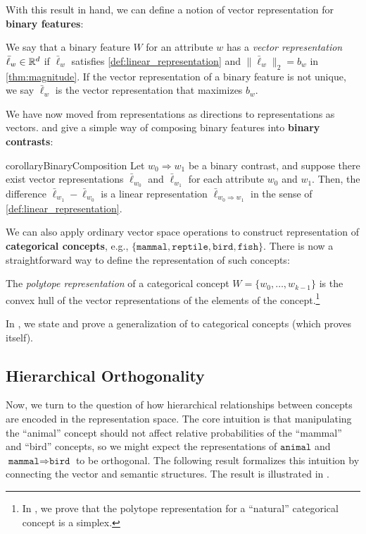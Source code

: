 \documentclass{article}
\newcommand{\ConceptName}[1]{$\mathtt{#1}$}
\newcommand{\ConceptValue}[1]{\texttt{#1}}
\newcommand{\ConceptDirName}[2]{\texttt{#1}\Rightarrow\texttt{#2}}
\newcommand{\ConceptDirMath}[2]{#1 \Rightarrow #2}
\begin{document}
With this result in hand, we can define a notion of vector representation for \textbf{binary features}:
\begin{definition}\label{def:vector_representation}
  We say that a binary feature $W$ for an attribute $w$ has a \emph{vector representation} $\bar{\ell}_w \in \mathbb{R}^d$ if $\bar{\ell}_w$ satisfies \cref{def:linear_representation} and $\|\bar{\ell}_w\|_2=b_w$ in \cref{thm:magnitude}.
  If the vector representation of a binary feature is not unique, we say $\bar\ell_w$ is the vector representation that maximizes $b_w$.
\end{definition} 

We have now moved from representations as directions to representations as vectors.
 and  give a simple way of composing binary features into \textbf{binary contrasts}:
\begin{restatable}{corollary}{BinaryComposition}\label{cor:binary}
  Let $\ConceptDirMath{w_0}{w_1}$ be a binary contrast, and suppose there exist vector representations $\bar\ell_{w_0}$ and $\bar\ell_{w_1}$ for each attribute $w_0$ and $w_1$.
  Then, the difference $\bar\ell_{w_1} - \bar\ell_{w_0}$ is a linear representation $\bar{\ell}_{\ConceptDirMath{w_0}{w_1}}$ in the sense of \cref{def:linear_representation}.
\end{restatable}


We can also apply ordinary vector space operations to construct representation of \textbf{categorical concepts}, e.g., $\{\ConceptValue{mammal},\ConceptValue{reptile},\ConceptValue{bird},\ConceptValue{fish}\}.$
There is now a straightforward way to define the representation of such concepts:
\begin{definition}\label{def:polytope}
  The \emph{polytope representation} of a categorical concept $W = \{w_0, \dots, w_{k-1}\}$ is the convex hull of the vector representations of the elements of the concept.\footnote{In , we prove that the polytope representation for a ``natural'' categorical concept is a simplex.}
\end{definition}
In , we state and prove a generalization of  to categorical concepts (which proves  itself).



\subsection{Hierarchical Orthogonality}
Now, we turn to the question of how hierarchical relationships between concepts are encoded in the representation space.
The core intuition is that manipulating the ``animal'' concept should not affect relative probabilities of the ``mammal'' and ``bird'' concepts, so we might expect the representations of \ConceptName{animal} and $\ConceptDirName{mammal}{bird}$ to be orthogonal. The following result formalizes this intuition by connecting the vector and semantic structures. The result is illustrated in .
\end{document}
